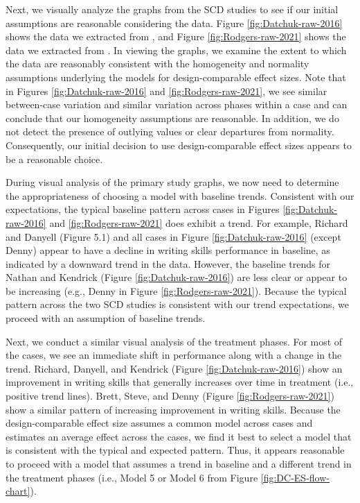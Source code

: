 \documentclass[
]{book}
\begin{document}
Next, we visually analyze the graphs from the SCD studies to see if our initial assumptions are reasonable considering the data. Figure \ref{fig:Datchuk-raw-2016} shows the data we extracted from \citet{datchuk2016Writing}, and Figure \ref{fig:Rodgers-raw-2021} shows the data we extracted from \citet{rodgers2021Effects}.
In viewing the graphs, we examine the extent to which the data are reasonably consistent with the homogeneity and normality assumptions underlying the models for design-comparable effect sizes. Note that in Figures \ref{fig:Datchuk-raw-2016} and \ref{fig:Rodgers-raw-2021}, we see similar between-case variation and similar variation across phases within a case and can conclude that our homogeneity assumptions are reasonable. In addition, we do not detect the presence of outlying values or clear departures from normality. Consequently, our initial decision to use design-comparable effect sizes appears to be a reasonable choice.

During visual analysis of the primary study graphs, we now need to determine the appropriateness of choosing a model with baseline trends. Consistent with our expectations, the typical baseline pattern across cases in Figures \ref{fig:Datchuk-raw-2016} and \ref{fig:Rodgers-raw-2021} does exhibit a trend. For example, Richard and Danyell (Figure 5.1) and all cases in Figure \ref{fig:Datchuk-raw-2016} (except Denny) appear to have a decline in writing skills performance in baseline, as indicated by a downward trend in the data. However, the baseline trends for Nathan and Kendrick (Figure \ref{fig:Datchuk-raw-2016}) are less clear or appear to be increasing (e.g., Denny in Figure \ref{fig:Rodgers-raw-2021}). Because the typical pattern across the two SCD studies is consistent with our trend expectations, we proceed with an assumption of baseline trends.

Next, we conduct a similar visual analysis of the treatment phases. For most of the cases, we see an immediate shift in performance along with a change in the trend. Richard, Danyell, and Kendrick (Figure \ref{fig:Datchuk-raw-2016}) show an improvement in writing skills that generally increases over time in treatment (i.e., positive trend lines). Brett, Steve, and Denny (Figure \ref{fig:Rodgers-raw-2021}) show a similar pattern of increasing improvement in writing skills. Because the design-comparable effect size assumes a common model across cases and estimates an average effect across the cases, we find it best to select a model that is consistent with the typical and expected pattern. Thus, it appears reasonable to proceed with a model that assumes a trend in baseline and a different trend in the treatment phases (i.e., Model 5 or Model 6 from Figure \ref{fig:DC-ES-flow-chart}).
\end{document}
